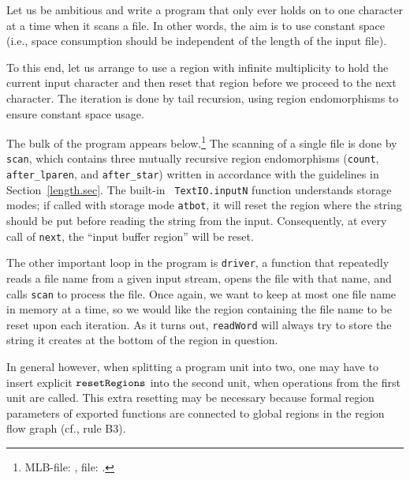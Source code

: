 \documentclass[12pt]{book}
\begin{document}
Let us be ambitious and write a program that only ever holds on to one
character at a time when it scans a file. In other words, the aim is
to use constant space (i.e., space consumption should be independent
of the length of the input file).

To this end, let us arrange to use a region with infinite multiplicity to
hold the current input character and then reset that region before we proceed
to the next character. The iteration is done by tail recursion, using region
endomorphisms to ensure constant space usage.

The bulk of the program appears below.\footnote{MLB-file:
  , file: .} The
scanning of a single file is done by {\tt scan}, which contains three
mutually recursive region endomorphisms ({\tt count}, {\tt
  after\_lparen}, and {\tt after\_star}) written in accordance with
the guidelines in Section~\ref{length.sec}. The built-in {\tt
  TextIO.inputN} function understands storage modes; if called with
storage mode {\tt atbot}, it will reset the region where the string
should be put before reading the string from the input.  Consequently,
at every call of {\tt next}, the ``input buffer region'' will be
reset.

The other important loop in the program is {\tt driver}, a function
that repeatedly reads a file name from a given input stream, opens the
file with that name, and calls {\tt scan} to process the file. Once
again, we want to keep at most one file name in memory at a time, so
we would like the region containing the file name to be reset upon
each iteration.  As it turns out, {\tt readWord} will always try to
store the string it creates at the bottom of the region in question.

In general however, when splitting a program unit into two, one may
have to insert explicit $\hbox{\tt resetRegions}$ into the second unit, when
operations from the first unit are called. This extra resetting may be
necessary because formal region parameters of exported functions are
connected to global regions in the region flow graph (cf., rule B3).
\end{document}
